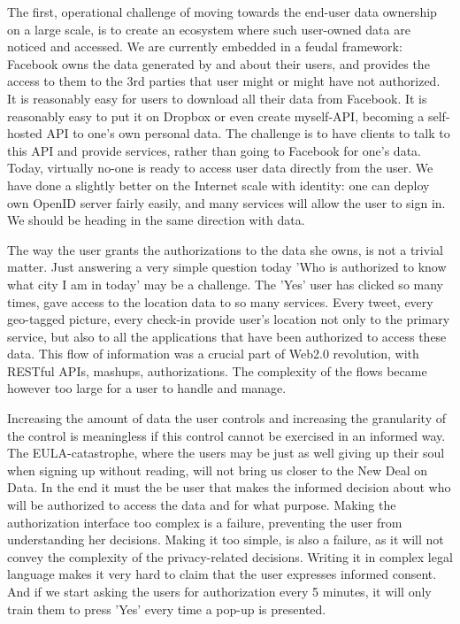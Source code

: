 The first, operational challenge of moving towards the end-user data ownership on a large scale, is to create an ecosystem where such user-owned data are noticed and accessed.
We are currently embedded in a feudal framework: Facebook owns the data generated by and about their users, and provides the access to them to the 3rd parties that user might or might have not authorized. 
It is reasonably easy for users to download all their data from Facebook. 
It is reasonably easy to put it on Dropbox or even create myself-API, becoming a self-hosted API to one's own personal data. 
The challenge is to have clients to talk to this API and provide services, rather than going to Facebook for one's data. 
Today, virtually no-one is ready to access user data directly from the user. 
We have done a slightly better on the Internet scale with identity: one can deploy own OpenID server fairly easily, and many services will allow the user to sign in. We should be heading in the same direction with data.

The way the user grants the authorizations to the data she owns, is not a trivial matter.
Just answering a very simple question today 'Who is authorized to know what city I am in today' may be a challenge.
The 'Yes' user has clicked so many times, gave access to the location data to so many services.
Every tweet, every geo-tagged picture, every check-in provide user's location not only to the primary service, but also to all the applications that have been authorized to access these data.
This flow of information was a crucial part of Web2.0 revolution, with RESTful APIs, mashups, authorizations.
The complexity of the flows became however too large for a user to handle and manage.

Increasing the amount of data the user controls and increasing the granularity of the control is meaningless if this control cannot be exercised in an informed way.
The EULA-catastrophe, where the users may be just as well giving up their soul when signing up without reading, will not bring us closer to the New Deal on Data.
In the end it must the be user that makes the informed decision about who will be authorized to access the data and for what purpose. 
Making the authorization interface too complex is a failure, preventing the user from understanding her decisions. 
Making it too simple, is also a failure, as it will not convey the complexity of the privacy-related decisions. 
Writing it in complex legal language makes it very hard to claim that the user expresses informed consent. 
And if we start asking the users for authorization every 5 minutes, it will only train them to press 'Yes' every time a pop-up is presented. 

